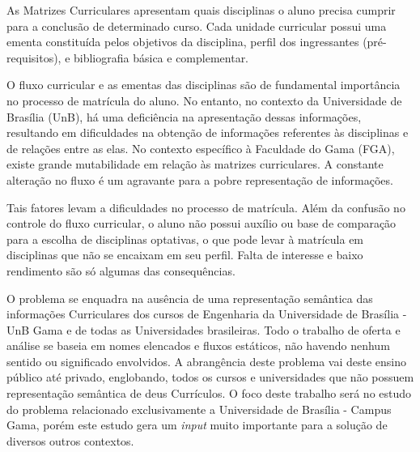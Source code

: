 
As Matrizes Curriculares apresentam quais disciplinas o aluno precisa cumprir para a conclusão de determinado curso. Cada unidade curricular possui uma ementa constituída pelos objetivos da disciplina, perfil dos ingressantes (pré-requisitos), e bibliografia básica e complementar. 

O fluxo curricular e as ementas das disciplinas são de fundamental importância no processo de matrícula do aluno. No entanto, no contexto da Universidade de Brasília (UnB), há uma deficiência na apresentação dessas informações, resultando em dificuldades na obtenção de informações referentes às disciplinas e de relações entre as elas. No contexto específico à Faculdade do Gama (FGA), existe grande mutabilidade em relação às matrizes curriculares. A constante alteração no fluxo é um agravante para a pobre representação de informações. 

Tais fatores levam a dificuldades no processo de matrícula. Além da confusão no controle do fluxo curricular, o aluno não possui auxílio ou base de comparação para a escolha de disciplinas optativas, o que pode levar à matrícula em disciplinas que não se encaixam em seu perfil. Falta de interesse e baixo rendimento são só algumas das consequências.

O problema se enquadra na ausência de uma representação semântica das informações Curriculares dos cursos de Engenharia da Universidade de Brasília - UnB Gama e de todas as Universidades brasileiras. Todo o trabalho de oferta e análise se baseia em nomes elencados e fluxos estáticos, não havendo nenhum sentido ou significado envolvidos. A abrangência deste problema vai deste ensino público até privado, englobando, todos os cursos e universidades que não possuem representação semântica de deus Currículos. O foco deste trabalho será no estudo do problema relacionado exclusivamente a Universidade de Brasília - Campus Gama, porém este estudo gera um \textit{input} muito importante para a solução de diversos outros contextos. 
